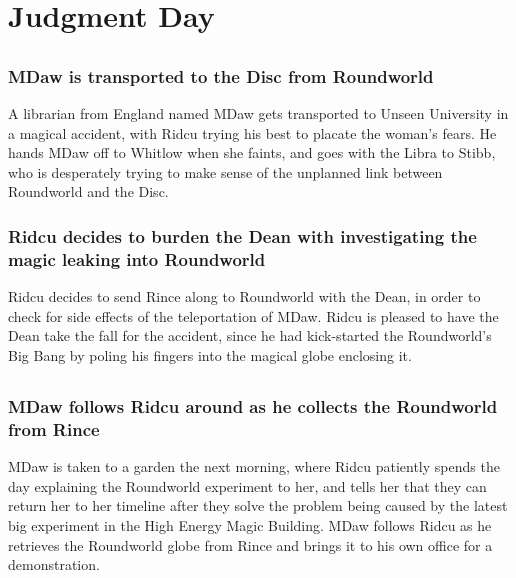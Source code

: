 \section{Judgment Day}


\subsection{}
\subsubsection{\Gls{MDaw} is transported to the Disc from Roundworld}
A librarian from England named \Gls{MDaw} gets transported to Unseen University in a magical
accident, with \Gls{Ridcu} trying his best to placate the woman's fears. He hands \Gls{MDaw} off
to \Gls{Whitlow} when she faints, and goes with the \Gls{Libra} to \Gls{Stibb}, who is desperately
trying to make sense of the unplanned link between Roundworld and the Disc.

\subsubsection{\Gls{Ridcu} decides to burden the \Gls{Dean} with investigating the magic leaking
    into Roundworld}
\Gls{Ridcu} decides to send \Gls{Rince} along to Roundworld with the \Gls{Dean}, in order to
check for side effects of the teleportation of \Gls{MDaw}. \Gls{Ridcu} is pleased to have the
\Gls{Dean} take the fall for the accident, since he had kick-started the Roundworld's Big Bang by
poling his fingers into the magical globe enclosing it.

\subsection{}
\subsubsection{\Gls{MDaw} follows \Gls{Ridcu} around as he collects the Roundworld from
    \Gls{Rince}}
\Gls{MDaw} is taken to a garden the next morning, where \Gls{Ridcu} patiently spends the day
explaining the Roundworld experiment to her, and tells her that they can return her to her timeline
after they solve the problem being caused by the latest big experiment in the High Energy Magic
Building. \Gls{MDaw} follows \Gls{Ridcu} as he retrieves the Roundworld globe from \Gls{Rince} and
brings it to his own office for a demonstration.

